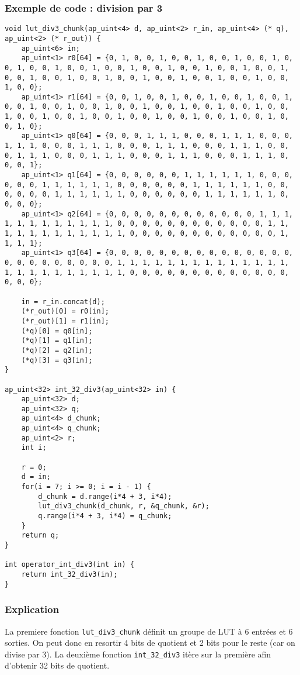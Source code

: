 \documentclass[10pt,a4paper,twoside]{article}
\begin{document}
\subsubsection{Exemple de code : division par 3}
\begin{verbatim}
void lut_div3_chunk(ap_uint<4> d, ap_uint<2> r_in, ap_uint<4> (* q), ap_uint<2> (* r_out)) {
	ap_uint<6> in;
	ap_uint<1> r0[64] = {0, 1, 0, 0, 1, 0, 0, 1, 0, 0, 1, 0, 0, 1, 0, 0, 1, 0, 0, 1, 0, 0, 1, 0, 0, 1, 0, 0, 1, 0, 0, 1, 0, 0, 1, 0, 0, 1, 0, 0, 1, 0, 0, 1, 0, 0, 1, 0, 0, 1, 0, 0, 1, 0, 0, 1, 0, 0, 1, 0, 0, 1, 0, 0};
	ap_uint<1> r1[64] = {0, 0, 1, 0, 0, 1, 0, 0, 1, 0, 0, 1, 0, 0, 1, 0, 0, 1, 0, 0, 1, 0, 0, 1, 0, 0, 1, 0, 0, 1, 0, 0, 1, 0, 0, 1, 0, 0, 1, 0, 0, 1, 0, 0, 1, 0, 0, 1, 0, 0, 1, 0, 0, 1, 0, 0, 1, 0, 0, 1, 0, 0, 1, 0};
	ap_uint<1> q0[64] = {0, 0, 0, 1, 1, 1, 0, 0, 0, 1, 1, 1, 0, 0, 0, 1, 1, 1, 0, 0, 0, 1, 1, 1, 0, 0, 0, 1, 1, 1, 0, 0, 0, 1, 1, 1, 0, 0, 0, 1, 1, 1, 0, 0, 0, 1, 1, 1, 0, 0, 0, 1, 1, 1, 0, 0, 0, 1, 1, 1, 0, 0, 0, 1};
	ap_uint<1> q1[64] = {0, 0, 0, 0, 0, 0, 1, 1, 1, 1, 1, 1, 0, 0, 0, 0, 0, 0, 1, 1, 1, 1, 1, 1, 0, 0, 0, 0, 0, 0, 1, 1, 1, 1, 1, 1, 0, 0, 0, 0, 0, 0, 1, 1, 1, 1, 1, 1, 0, 0, 0, 0, 0, 0, 1, 1, 1, 1, 1, 1, 0, 0, 0, 0};
	ap_uint<1> q2[64] = {0, 0, 0, 0, 0, 0, 0, 0, 0, 0, 0, 0, 1, 1, 1, 1, 1, 1, 1, 1, 1, 1, 1, 1, 0, 0, 0, 0, 0, 0, 0, 0, 0, 0, 0, 0, 1, 1, 1, 1, 1, 1, 1, 1, 1, 1, 1, 1, 0, 0, 0, 0, 0, 0, 0, 0, 0, 0, 0, 0, 1, 1, 1, 1};
	ap_uint<1> q3[64] = {0, 0, 0, 0, 0, 0, 0, 0, 0, 0, 0, 0, 0, 0, 0, 0, 0, 0, 0, 0, 0, 0, 0, 0, 1, 1, 1, 1, 1, 1, 1, 1, 1, 1, 1, 1, 1, 1, 1, 1, 1, 1, 1, 1, 1, 1, 1, 1, 0, 0, 0, 0, 0, 0, 0, 0, 0, 0, 0, 0, 0, 0, 0, 0};
	
	in = r_in.concat(d);
	(*r_out)[0] = r0[in];
	(*r_out)[1] = r1[in];
	(*q)[0] = q0[in];
	(*q)[1] = q1[in];
	(*q)[2] = q2[in];
	(*q)[3] = q3[in];
}

ap_uint<32> int_32_div3(ap_uint<32> in) {
	ap_uint<32> d;
	ap_uint<32> q;
	ap_uint<4> d_chunk;
	ap_uint<4> q_chunk;
	ap_uint<2> r;
	int i;
	
	r = 0;
	d = in;
	for(i = 7; i >= 0; i = i - 1) {
		d_chunk = d.range(i*4 + 3, i*4);
		lut_div3_chunk(d_chunk, r, &q_chunk, &r);
		q.range(i*4 + 3, i*4) = q_chunk;
	}
	return q;
}

int operator_int_div3(int in) {
	return int_32_div3(in);
}
\end{verbatim}

\subsubsection{Explication}
La premiere fonction \verb=lut_div3_chunk= définit un groupe de LUT à 6 entrées et 6 sorties. On peut donc en resortir 4 bits de
quotient et 2 bits pour le reste (car on divise par 3). La deuxième fonction \verb=int_32_div3= itère sur la première afin
d'obtenir 32 bits de quotient.
\end{document}
